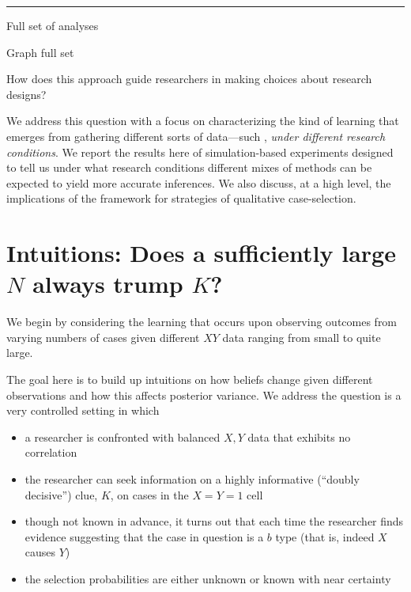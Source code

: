 \documentclass[12pt,]{book}
\providecommand{\tightlist}{%
  \setlength{\itemsep}{0pt}\setlength{\parskip}{0pt}}
\begin{document}
\begin{center}\rule{0.5\linewidth}{\linethickness}\end{center}

Full set of analyses

Graph full set

How does this approach guide researchers in making choices about research designs?

We address this question with a focus on characterizing the kind of learning that emerges from gathering different sorts of data---such , \emph{under different research conditions}. We report the results here of simulation-based experiments designed to tell us under what research conditions different mixes of methods can be expected to yield more accurate inferences. We also discuss, at a high level, the implications of the framework for strategies of qualitative case-selection.

\hypertarget{intuitions-does-a-sufficiently-large-n-always-trump-k}{%
\section{\texorpdfstring{Intuitions: Does a sufficiently large \(N\) always trump \(K\)?}{Intuitions: Does a sufficiently large N always trump K?}}\label{intuitions-does-a-sufficiently-large-n-always-trump-k}}

We begin by considering the learning that occurs upon observing outcomes from varying numbers of cases given different \(XY\) data ranging from small to quite large.

The goal here is to build up intuitions on how beliefs change given different observations and how this affects posterior variance. We address the question is a very controlled setting in which

\begin{itemize}
\tightlist
\item
  a researcher is confronted with balanced \(X,Y\) data that exhibits no correlation
\item
  the researcher can seek information on a highly informative (``doubly decisive'') clue, \(K\), on cases in the \(X=Y=1\) cell
\item
  though not known in advance, it turns out that each time the researcher finds evidence suggesting that the case in question is a \(b\) type (that is, indeed \(X\) causes \(Y\))
\item
  the selection probabilities are either unknown or known with near certainty
\end{itemize}
\end{document}
